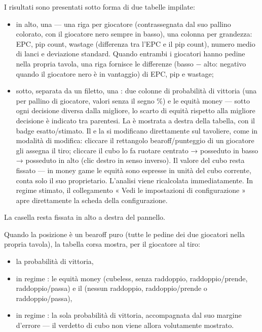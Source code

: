 \documentclass[letterpaper,10pt,italian]{sphinxmanual}
\begin{document}
\sphinxAtStartPar
I risultati sono presentati sotto forma di due tabelle impilate:
\begin{itemize}
\item {} 
\sphinxAtStartPar
in alto, una  — una riga per giocatore (contrassegnata dal suo pallino colorato, con il giocatore nero sempre in basso), una colonna per grandezza: EPC, pip count, wastage (differenza tra l’EPC e il pip count), numero medio di lanci e deviazione standard. Quando entrambi i giocatori hanno pedine nella propria tavola, una riga  fornisce le differenze  (basso − alto: negativo quando il giocatore nero è in vantaggio) di EPC, pip e wastage;

\item {} 
\sphinxAtStartPar
sotto, separata da un filetto, una : due colonne di probabilità di vittoria (una per pallino di giocatore, valori senza il segno \%) e le equità money — sotto ogni decisione diversa dalla migliore, lo scarto di equità rispetto alla migliore decisione è indicato tra parentesi. La  è mostrata a destra della tabella, con il badge esatto/stimato. Il  e la  si modificano direttamente sul tavoliere, come in modalità di modifica: cliccare il rettangolo bearoff/punteggio di un giocatore gli assegna il tiro; cliccare il cubo lo fa ruotare centrato → posseduto in basso → posseduto in alto (clic destro in senso inverso). Il valore del cubo resta fissato — in money game le equità sono espresse in unità del cubo corrente, conta solo il suo proprietario. L’analisi viene ricalcolata immediatamente. In regime stimato, il collegamento « Vedi le impostazioni di configurazione » apre direttamente la scheda  della configurazione.

\end{itemize}

\sphinxAtStartPar
La casella  resta fissata in alto a destra del pannello.

\sphinxAtStartPar
Quando la posizione è un bearoff puro (tutte le pedine dei due giocatori nella propria tavola), la tabella corsa mostra, per il giocatore al tiro:
\begin{itemize}
\item {} 
\sphinxAtStartPar
la probabilità di vittoria,

\item {} 
\sphinxAtStartPar
in regime : le equità money (cubeless, senza raddoppio, raddoppio/prende, raddoppio/passa) e il  (nessun raddoppio, raddoppio/prende o raddoppio/passa),

\item {} 
\sphinxAtStartPar
in regime : la sola probabilità di vittoria, accompagnata dal suo margine d’errore — il verdetto di cubo non viene allora volutamente mostrato.

\end{itemize}
\end{document}
